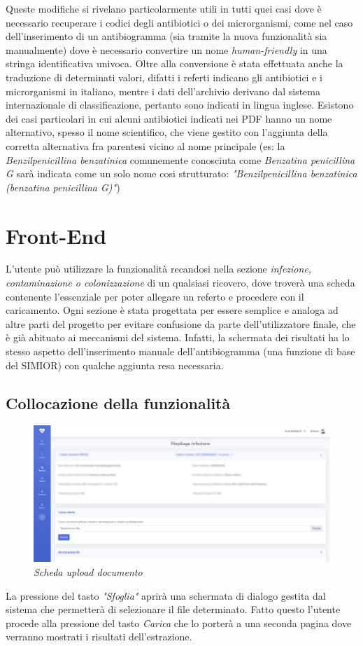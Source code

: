 Queste modifiche si rivelano particolarmente utili in tutti quei casi dove è necessario recuperare i codici degli antibiotici o dei microrganismi, come nel caso dell'inserimento di un antibiogramma (sia tramite la nuova funzionalità sia manualmente) dove è necessario convertire un nome \textit{human-friendly} in una stringa identificativa univoca.
Oltre alla conversione è stata effettuata anche la traduzione di determinati valori, difatti i referti indicano gli antibiotici e i microrganismi in italiano, mentre i dati dell'archivio derivano dal sistema internazionale di classificazione, pertanto sono indicati in lingua inglese. Esistono dei casi particolari in cui alcuni antibiotici indicati nei PDF hanno un nome alternativo, spesso il nome scientifico, che viene gestito con l'aggiunta della corretta alternativa fra parentesi vicino al nome principale (es: la \textit{Benzilpenicillina benzatinica} comunemente conosciuta come \textit{Benzatina penicillina G} sarà indicata come un solo nome cosi strutturato: \textit{"Benzilpenicillina benzatinica (benzatina penicillina G)"})
\newpage
\section{Front-End}
L'utente può utilizzare la funzionalità recandosi nella sezione \textit{infezione, contaminazione o colonizzazione} di un qualsiasi ricovero, dove troverà una scheda contenente l'essenziale per poter allegare un referto e procedere con il caricamento.
Ogni sezione è stata progettata per essere semplice e analoga ad altre parti del progetto per evitare confusione da parte dell'utilizzatore finale, che è già abituato ai meccanismi del sistema. Infatti, la schermata dei risultati ha lo stesso aspetto dell'inserimento manuale dell'antibiogramma (una funzione di base del SIMIOR) con qualche aggiunta resa necessaria.
\subsection{Collocazione della funzionalità}
\begin{figure}[h!]
	\centering
	\includegraphics[width=.99\columnwidth]{images/feature_location.png}
	\caption{\textit{Scheda upload documento}}
	\label{fig:feature_location}
\end{figure}
La pressione del tasto \textit{"Sfoglia"} aprirà una schermata di dialogo gestita dal sistema che permetterà di selezionare il file determinato. Fatto questo l'utente procede alla pressione del tasto \textit{Carica} che lo porterà a una seconda pagina dove verranno mostrati i risultati dell'estrazione.
\newpage
